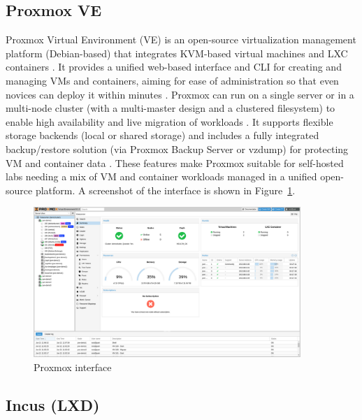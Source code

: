 \subsection{Proxmox VE}

Proxmox Virtual Environment (VE) is an open-source virtualization management platform (Debian-based) that integrates KVM-based virtual machines and LXC containers \cite{ProxmoxAdminGuide2025}. It provides a unified web-based interface and CLI for creating and managing VMs and containers, aiming for ease of administration so that even novices can deploy it within minutes \cite{ProxmoxAdminGuide2025}. Proxmox can run on a single server or in a multi-node cluster (with a multi-master design and a clustered filesystem) to enable high availability and live migration of workloads \cite{ProxmoxAdminGuide2025}. It supports flexible storage backends (local or shared storage) and includes a fully integrated backup/restore solution (via Proxmox Backup Server or vzdump) for protecting VM and container data \cite{ProxmoxAdminGuide2025}. These features make Proxmox suitable for self-hosted labs needing a mix of VM and container workloads managed in a unified open-source platform. A screenshot of the interface is shown in Figure~\ref{fig:proxmox-ui}.

\begin{figure}[H]
  \centering
  \includegraphics[width=0.9\textwidth]{imaxes/proxmox-ui.png}
  \caption{Proxmox interface}
  \label{fig:proxmox-ui}
\end{figure}

\subsection{Incus (LXD)}

